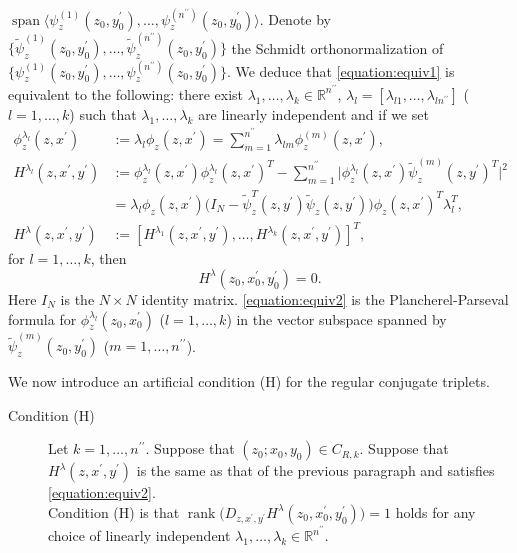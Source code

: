\documentclass[a4paper,11pt,reqno]{amsart}
\theoremstyle{definition}
\theoremstyle{remark}
\begin{document}
$\operatorname{span}\bigl\langle\psi_z^{(1)}(z_0,y_0^\prime),\dotsc,\psi_z^{(n^{\prime\prime})}(z_0,y_0^\prime)\bigr\rangle$. 
Denote by 
$\{\tilde{\psi}_z^{(1)}(z_0,y_0^\prime),\dotsc,\tilde{\psi}_z^{(n^{\prime\prime})}(z_0,y_0^\prime)\}$ 
the Schmidt orthonormalization of  
$\{\psi_z^{(1)}(z_0,y_0^\prime),\dotsc,\psi_z^{(n^{\prime\prime})}(z_0,y_0^\prime)\}$. 
We deduce that \eqref{equation:equiv1} is equivalent to the following: there exist 
$\lambda_1,\dotsc,\lambda_k \in \mathbb{R}^{n^{\prime\prime}}$, 
$\lambda_l=[\lambda_{l1},\dotsc,\lambda_{ln^{\prime\prime}}]$ ($l=1,\dotsc,k$) such that 
$\lambda_1,\dotsc,\lambda_k$ are linearly independent and if we set 
%
%
\begin{align*}
  \phi_z^{\lambda_l}(z,x^\prime)
& :=
  \lambda_l
  \phi_z(z,x^\prime)
  =
  \sum_{m=1}^{n^{\prime\prime}}
  \lambda_{lm}
  \phi_z^{(m)}(z,x^\prime),
\\
  H^{\lambda_l}(z,x^\prime,y^\prime)
& :=
  \phi_z^{\lambda_l}(z,x^\prime)\phi_z^{\lambda_l}(z,x^\prime)^T
  -
  \sum_{m=1}^{n^{\prime\prime}}
  \bigl\lvert
  \phi_z^{\lambda_l}(z,x^\prime)
  \tilde{\psi}_z^{(m)}(z,y^\prime)^T
  \bigr\rvert^2 
\\
& =
  \lambda_l\phi_z(z,x^\prime)
  \bigl(I_N-\tilde{\psi}_z^T(z,y^\prime)\tilde{\psi}_z(z,y^\prime)\bigr)
  \phi_z(z,x^\prime)^T\lambda_l^T, 
\\ 
  H^\lambda(z,x^\prime,y^\prime)
& :=
  [H^{\lambda_1}(z,x^\prime,y^\prime),\dotsc,H^{\lambda_k}(z,x^\prime,y^\prime)]^T, 
\end{align*}
%
%
for $l=1,\dotsc,k$, then 
%
%
\begin{equation}
H^{\lambda}(z_0,x_0^\prime,y_0^\prime)=0. 
\label{equation:equiv2}
\end{equation}
%
%
Here $I_N$ is the $N{\times}N$ identity matrix. 
\eqref{equation:equiv2} is the Plancherel-Parseval formula for 
$\phi_z^{\lambda_l}(z_0,x_0^\prime)$ ($l=1,\dotsc,k$) in the vector subspace spanned by 
$\tilde{\psi}_z^{(m)}(z_0,y_0^\prime)$ ($m=1,\dotsc,n^{\prime\prime}$). 
%
%
\par
%
%
We now introduce an artificial condition (H) for the regular conjugate triplets.  
%
%
\begin{description}
\item[Condition (H)] 
Let $k=1,\dotsc,n^{\prime\prime}$. Suppose that $(z_0;x_0,y_0) \in C_{R,k}$. 
Suppose that $H^{\lambda}(z,x^\prime,y^\prime)$ is the same as that of the previous paragraph and satisfies \eqref{equation:equiv2}. 
\\
Condition (H) is that $\operatorname{rank}\bigl(D_{z,x^\prime,y^\prime}H^{\lambda}(z_0,x_0^\prime,y_0^\prime)\bigr)=1$ holds for any choice of linearly independent $\lambda_1,\dotsc,\lambda_k \in \mathbb{R}^{n^{\prime\prime}}$.  
\end{description}
\end{document}
